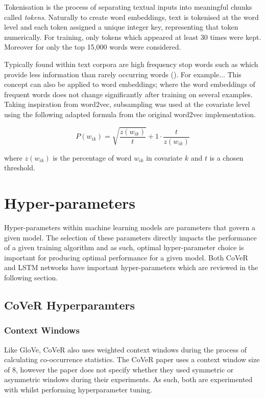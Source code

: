 \noindent
\newline
Tokenisation is the process of separating textual inputs into meaningful chunks called \textit{tokens}. Naturally to create word embeddings, text is tokenised at the word level and each token assigned a unique integer key, representing that token numerically. For training, only tokens which appeared at least 30 times were kept. Moreover for only the top 15,000 words were considered.
 
\noindent
\newline
Typically found within text corpora are high frequency stop words such as which provide less information than rarely occurring words (\cite{Mikolov2013a}). For example... This concept can also be applied to word embeddings; where the word embeddings of frequent words does not change significantly after training on several examples. Taking inspiration from word2vec, subsampling was used at the covariate level using the following adapted formula from the original word2vec implementation.

\begin{equation}
P(w_{ik}) = \sqrt{\dfrac{z(w_{ik})}{t}} + 1 \cdot \dfrac{t}{z(w_{ik})}
\end{equation}

\noindent
\newline
where \(z(w_{ik})\) is the percentage of word \(w_{ik}\) in covariate \(k\) and \(t\) is a chosen threshold.

\section{Hyper-parameters}
Hyper-parameters within machine learning models are parameters that govern a given model. The selection of these parameters directly impacts the performance of a given training algorithm and as such, optimal hyper-parameter choice is important for producing optimal performance for a given model. Both CoVeR and LSTM networks have important hyper-parameters which are reviewed in the following section.
\subsection{CoVeR Hyperparamters}
\subsubsection{Context Windows}
Like GloVe, CoVeR also uses weighted context windows during the process of calculating co-occurrence statistics. The CoVeR paper uses a context window size of 8, however the paper does not specify whether they used symmetric or asymmetric windows during their experiments. As such, both are experimented with whilst performing hyperparameter tuning.  

